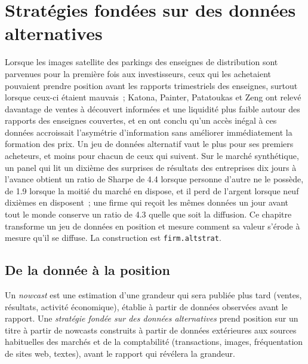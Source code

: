\chapter{Stratégies fondées sur des données alternatives}\label{ch:s1:alternative-data-strategies}

Lorsque les images satellite des parkings des enseignes de distribution sont parvenues pour la première fois aux investisseurs, ceux qui les achetaient pouvaient prendre position avant les rapports trimestriels des enseignes,
surtout lorsque ceux-ci étaient mauvais~; Katona, Painter, Patatoukas et Zeng ont relevé davantage de ventes à découvert informées et une liquidité plus faible autour des rapports des enseignes couvertes,
et en ont conclu qu'un accès inégal à ces données accroissait l'asymétrie d'information sans améliorer immédiatement la formation des prix. Un jeu de données alternatif
vaut le plus pour ses premiers acheteurs, et moins pour chacun de ceux qui suivent. Sur le marché synthétique, un panel qui lit un dixième des surprises de résultats des entreprises dix jours
à l'avance obtient un ratio de Sharpe de 4.4 lorsque personne d'autre ne le possède, de 1.9 lorsque la moitié du marché en dispose, et il perd de l'argent lorsque neuf dixièmes en disposent~; une firme qui reçoit les mêmes données un
jour avant tout le monde conserve un ratio de 4.3 quelle que soit la diffusion. Ce chapitre transforme un jeu de données en position et mesure comment sa valeur s'érode à mesure qu'il se diffuse. La
construction est \texttt{firm.altstrat}.

\section{De la donnée à la position}

\begin{definition}\label{def:s1:alternative-data-strategies:nowcast}
Un \emph{nowcast} est une estimation d'une grandeur qui sera publiée plus tard (ventes, résultats, activité économique), établie à partir de données observées
avant le rapport. Une \emph{stratégie fondée sur des données alternatives} prend position sur un titre à partir de nowcasts construits à partir de données extérieures aux
sources habituelles des marchés et de la comptabilité (transactions, images, fréquentation de sites web, textes), avant le rapport qui révélera la grandeur.
\end{definition}

